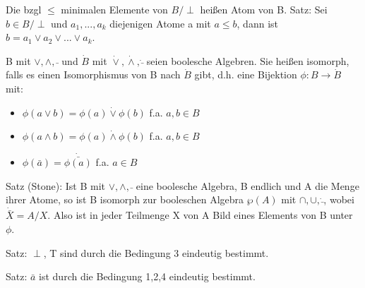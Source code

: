 \documentclass[10pt,landscape]{article}
\begin{document}
\begin{multicols}{3}
Die bzgl $\leq$ minimalen Elemente von $B /\perp$ heißen Atom von B.
Satz: Sei $b\in B /\perp$ und $a_1,...,a_k$ diejenigen Atome a mit $a\leq b$, dann ist $b= a_1 \vee a_2 \vee ... \vee a_k$.

B mit $\vee, \wedge, \bar{ }$ und $\dot{B}$ mit $\dot{\vee}, \dot{\wedge}, \dot{\bar{}}$ seien boolesche Algebren. Sie heißen isomorph, falls es einen Isomorphismus von B nach $\dot{B}$ gibt, d.h. eine Bijektion $\phi: B \rightarrow \dot{B}$ mit:
\begin{itemize}
    \item $\phi(a\vee b) =\phi(a)\dot{\vee}\phi(b)$ f.a. $a,b \in B$
    \item $\phi(a\wedge b)=\phi(a)\dot{\wedge}\phi(b)$ f.a. $a,b\in B$
    \item $\phi(\bar{a}) = \dot{\bar{\phi(a)}}$ f.a. $a\in B$
\end{itemize}

Satz (Stone): Ist B mit $\vee, \wedge, \bar{}$ eine boolesche Algebra, B endlich und A die Menge ihrer Atome, so ist B isomorph zur booleschen Algebra $\wp(A)$ mit $\cap,\cup,\dot{\bar{}}$, wobei $\dot{\bar{X}}=A/X$.
Also ist in jeder Teilmenge X von A Bild eines Elements von B unter $\phi$.

Satz: $\perp$, T sind durch die Bedingung 3 eindeutig bestimmt.

Satz: $\bar{a}$ ist durch die Bedingung 1,2,4 eindeutig bestimmt.


\end{multicols}
\end{document}
